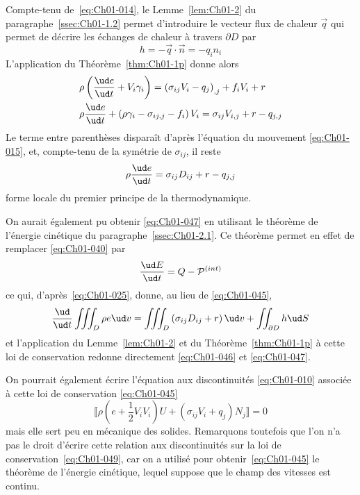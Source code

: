 Compte-tenu de~\eqref{eq:Ch01-014}, le Lemme~\ref{lem:Ch01-2} du paragraphe~\ref{ssec:Ch01-1.2} permet d'introduire le vecteur flux de chaleur $\vec{q}$ qui permet de décrire les échanges de chaleur à travers $\partial D$ par
\begin{equation}
    h = - \vec{q} \cdot \vec{n} = -q_i n_i
    \label{eq:Ch01-046}
\end{equation}
L'application du Théorème~\ref{thm:Ch01-1p} donne alors
\begin{align*}
    & \rho \left( \frac{\ud e}{\ud t} + V_i \gamma_i \right) = \left( \sigma_{ij} V_i - q_j \right)_{,j} + f_i V_i + r\\
    & \rho \frac{\ud e}{\ud t} + \left( \rho \gamma_i - \sigma_{ij,j} - f_i \right) V_i = \sigma_{ij} V_{i,j} + r - q_{j,j}
\end{align*}
Le terme entre parenthèses disparaît d'après l'équation du mouvement \eqref{eq:Ch01-015}, et, compte-tenu de la symétrie de $\sigma_{ij}$, il reste
\begin{equation}
    \rho \frac{\ud e }{\ud t} = \sigma_{ij} D_{ij} + r - q_{j,j}
    \label{eq:Ch01-047}
\end{equation}
forme  locale du premier principe de la thermodynamique.

On aurait également pu obtenir \eqref{eq:Ch01-047} en utilisant le théorème de l'énergie cinétique du paragraphe~\ref{ssec:Ch01-2.1}.
Ce théorème permet en effet de remplacer \eqref{eq:Ch01-040} par
\begin{equation}
    \frac{\ud E}{\ud t} = Q - \mathcal{P}^{(int)}
    \label{eq:Ch01-048}
\end{equation}
ce  qui, d'après~\eqref{eq:Ch01-025}, donne, au lieu de \eqref{eq:Ch01-045},
\begin{equation}
    \frac{\ud}{\ud t} \iiint_{D} \rho e \ud v = \iiint_{D} \left( \sigma_{ij} D_{ij} + r \right) \ud v + \iint_{\partial D} h \ud S
    \label{eq:Ch01-049}
\end{equation}
et l'application du Lemme~\ref{lem:Ch01-2} et du Théorème~\ref{thm:Ch01-1p} à cette loi de conservation redonne directement \eqref{eq:Ch01-046} et \eqref{eq:Ch01-047}.

On pourrait également écrire l'équation aux discontinuités \eqref{eq:Ch01-010} associée à cette loi de conservation \eqref{eq:Ch01-045}
\begin{equation}
    \llbracket \rho \left( e + \frac{1}{2} V_i V_i \right) U + \left( \sigma_{ij} V_i + q_j \right) N_j \rrbracket = 0
    \label{eq:Ch01-050}
\end{equation}
mais elle sert peu en mécanique des solides.
Remarquons toutefois que l'on n'a pas le droit d'écrire cette relation aux discontinuités sur la loi de conservation~\eqref{eq:Ch01-049}, car on a utilisé pour obtenir~\eqref{eq:Ch01-045} le théorème de l'énergie cinétique, lequel suppose que le champ des vitesses est continu.

